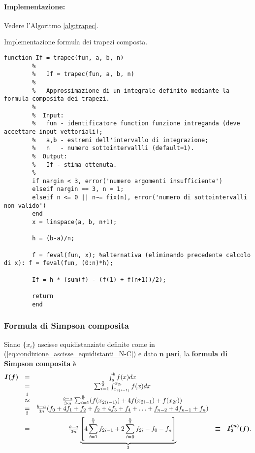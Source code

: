 \paragraph{Implementazione:} Vedere l'Algoritmo \ref{alg:trapec}.

\begin{algorithm}
	\caption{Implementazione formula dei trapezi composta.}\label{alg:trapec}
	\begin{lstlisting}[style=Matlab-editor]
		function If = trapec(fun, a, b, n)
		%   
		%   If = trapec(fun, a, b, n)
		%
		%   Approssimazione di un integrale definito mediante la formula composita dei trapezi.
		%
		%  Input:
		%   fun - identificatore function funzione intreganda (deve accettare input vettoriali);
		%   a,b - estremi dell'intervallo di integrazione;
		%   n   - numero sottointervallli (default=1).
		%  Output:
		%   If - stima ottenuta.
		%
		if nargin < 3, error('numero argomenti insufficiente')
		elseif nargin == 3, n = 1;
		elseif n <= 0 || n~= fix(n), error('numero di sottointervalli non valido')
		end
		x = linspace(a, b, n+1);
		
		h = (b-a)/n;
		
		f = feval(fun, x); %alternativa (eliminando precedente calcolo di x): f = feval(fun, (0:n)*h);
		
		If = h * (sum(f) - (f(1) + f(n+1))/2);
		
		return
		end
	\end{lstlisting}
\end{algorithm}

\subsubsection{Formula di Simpson composita}
\begin{definition}
    Siano $\{x_i\}$ ascisse equidistanziate definite come in (\ref{eq:condizione_ascisse_equidistanti_N-C}) e dato $\boldsymbol n$ \textbf{pari}, la \textbf{formula di Simpson composita} è
    \begin{equation}\label{eq:formSimpComp}
        \begin{matrix}
            \boldsymbol{I(f)}&=&\int_a^bf(x)dx\\
            &=&\sum_{i=1}^{\frac{n}{2}}\int_{x_{2(i-1)}}^{x_{2i}}f(x)dx\\
            &\overset{\footnotemark}{\approx}&\frac{b-a}{3\cdot n}\sum_{i=1}^{\frac{n}{2}}(f(x_{2(i-1)})+4f(x_{2i-1})+f(x_{2i}))\\
            &\underset{\footnotemark}{=}&\frac{b-a}{3n}(\underline{f_0+4f_1+f_2}+\underline{f_2+4f_3+f_4}+\hdots+\underline{f_{n-2}+4f_{n-1}+f_n})\\
            &=&\frac{b-a}{3n}\underbrace{\left[4\sum_{i=1}^{\frac{n}{2}}f_{2i-1}+2\sum_{i=0}^{\frac{n}{2}}f_{2i}-f_0-f_n\right]}_{\footnotemark}&\boldsymbol\equiv& \boldsymbol{I_2^{(n)}(f)}.
        \end{matrix}
    \end{equation}
\end{definition}

